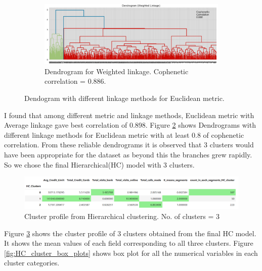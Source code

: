 \documentclass[10pt,a4paper]{style}
\begin{document}
\begin{figure}[h]
\begin{subfigure}[t]{0.49\textwidth}
				\includegraphics[width=\textwidth]{Euc_dendo_Weighted_linkage.png}
				\caption{Dendrogram for Weighted linkage. Cophenetic correlation = 0.886.}
				\label{fig:Euc_dendo_Weighted_linkage.png}
			\end{subfigure}
			\caption{Dendogram with different linkage methods for Euclidean metric.}
			\label{fig:Dendogram with different linkage methods for Euclidean metric.}
		\end{figure}
		I found that among different metric and linkage methods, Euclidean metric with Average linkage gave best correlation of 0.898. Figure \ref{fig:Dendogram with different linkage methods for Euclidean metric.} shows Dendrograms with different linkage methods for Euclidean metric with at least 0.8 of cophenetic correlation. From these reliable dendrograms it is observed that 3 clusters would have been appropriate for the dataset as beyond this the branches grew rapidly. So we chose the final Hierarchical(HC) model with 3 clusters. 
	
		\begin{figure}[h]
			\centering
			\includegraphics[width=\textwidth]{HC_profile.png}
			\caption{Cluster profile from Hierarchical clustering. No. of clusters = 3}
			\label{fig:HC_profile}
		\end{figure}
		Figure \ref{fig:HC_profile} shows the cluster profile of 3 clusters obtained from the final HC model. It shows the mean values of each field corresponding to all three clusters. Figure \ref{fig:HC_cluster_box_plots} shows box plot for all the numerical variables in each cluster categories.
		
\end{document}
